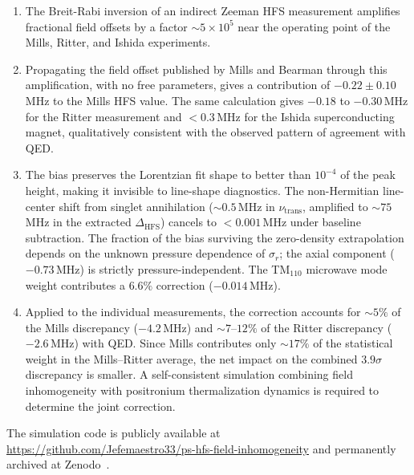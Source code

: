 \documentclass[twocolumn,pra,aps,superscriptaddress,floatfix,10pt]{revtex4-2}
\begin{document}
\begin{enumerate}
  \item[(i)] The Breit-Rabi inversion of an indirect Zeeman HFS measurement amplifies fractional field offsets by a factor $\sim 5 \times 10^5$ near the operating point of the Mills, Ritter, and Ishida experiments.

  \item[(ii)] Propagating the field offset published by Mills and Bearman through this amplification, with no free parameters, gives a contribution of $-0.22 \pm 0.10$\,MHz to the Mills HFS value. The same calculation gives $-0.18$ to $-0.30$\,MHz for the Ritter measurement and $< 0.3$\,MHz for the Ishida superconducting magnet, qualitatively consistent with the observed pattern of agreement with QED.

  \item[(iii)] The bias preserves the Lorentzian fit shape to better than $10^{-4}$ of the peak height, making it invisible to line-shape diagnostics. The non-Hermitian line-center shift from singlet annihilation ($\sim 0.5$\,MHz in $\nu_\mathrm{trans}$, amplified to $\sim 75$\,MHz in the extracted $\Delta_\mathrm{HFS}$) cancels to $< 0.001$\,MHz under baseline subtraction. The fraction of the bias surviving the zero-density extrapolation depends on the unknown pressure dependence of $\sigma_r$; the axial component ($-0.73$\,MHz) is strictly pressure-independent. The TM$_{110}$ microwave mode weight contributes a $6.6\%$ correction ($-0.014$\,MHz).

  \item[(iv)] Applied to the individual measurements, the correction accounts for $\sim 5\%$ of the Mills discrepancy ($-4.2$\,MHz) and $\sim 7$--$12\%$ of the Ritter discrepancy ($-2.6$\,MHz) with QED. Since Mills contributes only $\sim 17\%$ of the statistical weight in the Mills--Ritter average, the net impact on the combined $3.9\sigma$ discrepancy is smaller. A self-consistent simulation combining field inhomogeneity with positronium thermalization dynamics is required to determine the joint correction.
\end{enumerate}

\begin{acknowledgments}
The simulation code is publicly available at \url{https://github.com/Jefemaestro33/ps-hfs-field-inhomogeneity} and permanently archived at Zenodo~\cite{ZermenoCode2026}.
\end{acknowledgments}


\end{document}
